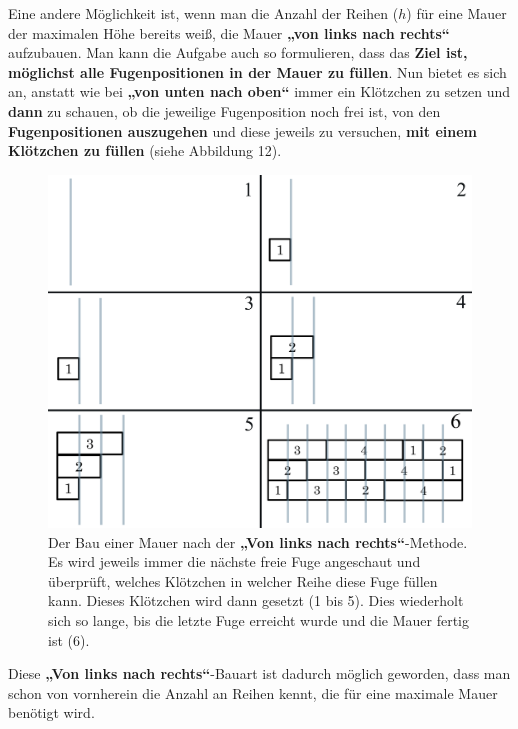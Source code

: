 \documentclass[a4paper,12pt]{article}
\begin{document}
Eine andere Möglichkeit ist, wenn man die Anzahl der Reihen ($h$) für eine Mauer der maximalen Höhe bereits weiß, die Mauer \textbf{„von links nach rechts“} aufzubauen.
Man kann die Aufgabe auch so formulieren, dass das \textbf{Ziel ist, möglichst alle Fugenpositionen in der Mauer zu füllen}. Nun bietet es sich an, anstatt wie bei \textbf{„von unten nach oben“} immer ein Klötzchen zu setzen und \textbf{dann} zu schauen, ob die jeweilige Fugenposition noch frei ist, von den \textbf{Fugenpositionen auszugehen} und diese jeweils zu versuchen, \textbf{mit einem Klötzchen zu füllen} (siehe Abbildung 12).
\begin{figure}[H]
    \centering
    \includegraphics[width=1\linewidth]{Bilder/Aufgabe1/Definition_Mauerbauart_02.png}
    \caption{Der Bau einer Mauer nach der \textbf{„Von links nach rechts“}-Methode. Es wird jeweils immer die nächste freie Fuge angeschaut und überprüft, welches Klötzchen in welcher Reihe diese Fuge füllen kann. Dieses Klötzchen wird dann gesetzt (1 bis 5). Dies wiederholt sich so lange, bis die letzte Fuge erreicht wurde und die Mauer fertig ist (6).}
\end{figure}

Diese \textbf{„Von links nach rechts“}-Bauart ist dadurch möglich geworden, dass man schon von vornherein die Anzahl an Reihen kennt, die für eine maximale Mauer benötigt wird.
\end{document}
